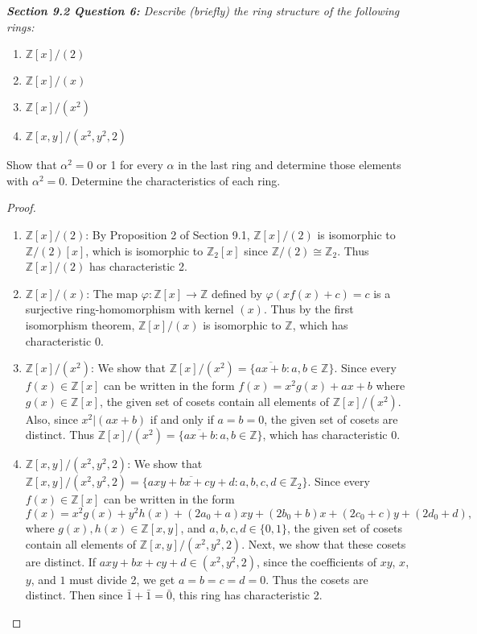 \documentclass{article}
\begin{document}
\it \textbf{Section 9.2 Question 6:} Describe (briefly) the ring structure
  of the following rings:
  \begin{enumerate}[label={(\alph*)}]
    \item $\mathbb{Z}[x]/(2)$
    \item $\mathbb{Z}[x]/(x)$
    \item $\mathbb{Z}[x]/(x^2)$
    \item $\mathbb{Z}[x,y]/(x^2,y^2,2)$
  \end{enumerate}
  Show that $\alpha^2=0$ or 1 for every $\alpha$ in the last ring and
  determine those elements with $\alpha^2=0$. Determine the characteristics
  of each ring.

  \begin{proof}
    \begin{enumerate}[label={(\alph*)}]
      \item $\mathbb{Z}[x]/(2)$: By Proposition 2 of Section 9.1,
        $\mathbb{Z}[x]/(2)$ is isomorphic to $\mathbb{Z}/(2)[x]$, which is
        isomorphic to $\mathbb{Z}_2[x]$ since
        $\mathbb{Z}/(2)\cong\mathbb{Z}_2$. Thus $\mathbb{Z}[x]/(2)$ has
        characteristic 2.

      \item $\mathbb{Z}[x]/(x)$: The map
        $\varphi:\mathbb{Z}[x]\rightarrow\mathbb{Z}$ defined by
        $\varphi(xf(x)+c)=c$ is a surjective ring-homomorphism with kernel
        $(x)$. Thus by the first isomorphism theorem, $\mathbb{Z}[x]/(x)$
        is isomorphic to $\mathbb{Z}$, which has characteristic 0.

      \item $\mathbb{Z}[x]/(x^2)$: We show that $\mathbb{Z}[x]/(x^2)
        =\{\overline{ax+b}:a,b\in\mathbb{Z}\}$. Since every
        $f(x)\in\mathbb{Z}[x]$ can be written in the form
        $f(x)=x^2g(x)+ax+b$ where $g(x)\in\mathbb{Z}[x]$, the given set of
        cosets contain all elements of $\mathbb{Z}[x]/(x^2)$. Also, since
        $x^2|(ax+b)$ if and only if $a=b=0$, the given set of cosets are
        distinct. Thus $\mathbb{Z}[x]/(x^2)
        =\{\overline{ax+b}:a,b\in\mathbb{Z}\}$, which has characteristic 0.

      \item $\mathbb{Z}[x,y]/(x^2,y^2,2)$: We show that
        $\mathbb{Z}[x,y]/(x^2,y^2,2)
        =\{\overline{axy+bx+cy+d}:a,b,c,d\in\mathbb{Z}_2\}$. Since every
        $f(x)\in\mathbb{Z}[x]$ can be written in the form
        \[f(x)=x^2g(x)+y^2h(x)+(2a_0+a)xy+(2b_0+b)x+(2c_0+c)y+(2d_0+d),\]
        where $g(x),h(x)\in\mathbb{Z}[x,y]$, and $a,b,c,d\in\{0,1\}$, the
        given set of cosets contain all elements of
        $\mathbb{Z}[x,y]/(x^2,y^2,2)$. Next, we show that these cosets are
        distinct. If $axy+bx+cy+d\in(x^2,y^2,2)$, since the coefficients of
        $xy$, $x$, $y$, and $1$ must divide 2, we get $a=b=c=d=0$. Thus the
        cosets are distinct. Then since $\bar{1}+\bar{1}=\bar{0}$, this
        ring has characteristic 2.
    \end{enumerate}
  \end{proof}
\end{document}
